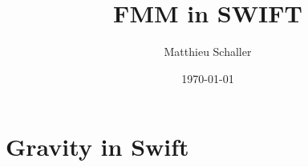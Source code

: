 \documentclass[fleqn, usenatbib, useAMS, a4paper]{mnras}
\title{FMM in SWIFT}
\author{Matthieu Schaller}
\newcommand{\swift}{{\sc Swift}\xspace}
\begin{document}
\date{\today}

\pagerange{\pageref{firstpage}--\pageref{lastpage}} 

\maketitle

\label{firstpage}

\begin{abstract}
\end{abstract}

\begin{keywords}
\end{keywords}

\section{Gravity in \swift}
\label{sec:gravity}



%







\appendix

\onecolumn



\label{lastpage}
\end{document}
